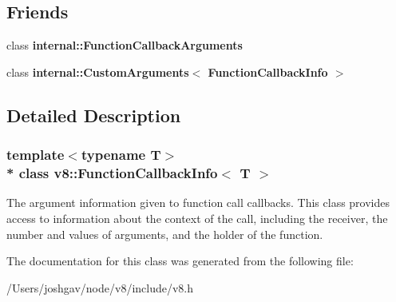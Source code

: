 \subsection*{Friends}
\begin{DoxyCompactItemize}
\item 
class {\bfseries internal\+::\+Function\+Callback\+Arguments}\hypertarget{classv8_1_1_function_callback_info_aac7268b20857fd75b69b86ded46d0f34}{}\label{classv8_1_1_function_callback_info_aac7268b20857fd75b69b86ded46d0f34}

\item 
class {\bfseries internal\+::\+Custom\+Arguments$<$ Function\+Callback\+Info $>$}\hypertarget{classv8_1_1_function_callback_info_a02d869d89b14ddd1717429c2106f955a}{}\label{classv8_1_1_function_callback_info_a02d869d89b14ddd1717429c2106f955a}

\end{DoxyCompactItemize}


\subsection{Detailed Description}
\subsubsection*{template$<$typename T$>$\\*
class v8\+::\+Function\+Callback\+Info$<$ T $>$}

The argument information given to function call callbacks. This class provides access to information about the context of the call, including the receiver, the number and values of arguments, and the holder of the function. 

The documentation for this class was generated from the following file\+:\begin{DoxyCompactItemize}
\item 
/\+Users/joshgav/node/v8/include/v8.\+h\end{DoxyCompactItemize}
